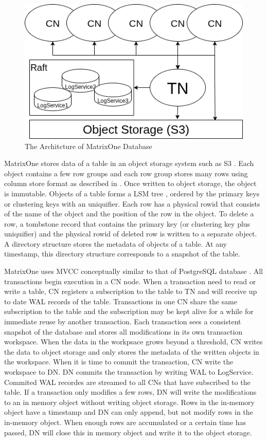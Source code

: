\documentclass[sigconf,nonacm]{acmart} %
\begin{document}
\begin{figure}[h]
  \centering
  \includegraphics[width=\linewidth]{m1a}
  \caption{The Architcture of MatrixOne Database}
\end{figure}

MatrixOne stores data of a table in an object storage system such as S3 \cite{S3}.  
Each object contains a few row groups and each row group stores many rows 
using column store format as described in \cite{ColumnStore}.  
Once written to object storage, the object is immutable.  
Objects of a table forms a LSM tree \cite{LSMTree}, 
ordered by the primary keys or clustering keys with an uniquifier.  
Each row has a physical rowid that consists of the name of the object 
and the position of the row in the object.
To delete a row, a tombstone record that contains the primary key 
(or clustering key plus uniquifier) and the physical rowid
of deleted row is written to a separate object.
A directory structure stores the metadata of objects of a table.  
At any timestamp, this directory structure corresponds 
to a snapshot of the table.

MatrixOne uses MVCC conceptually similar to that of 
PostgreSQL database \cite{PostgreSQL}.  
All transactions begin execution in a CN node.  When a transaction need to 
read or write a table, CN registers a subscription to the table to TN and
will receive up to date WAL records of the table.  Transactions in one CN
share the same subscription to the table and the subscription may be kept
alive for a while for immediate reuse by another transaction.
Each transaction sees a consistent snapshot of the database and stores 
all modifications in its own transaction workspace.  
When the data in the workpsace grows beyond a threshold, CN 
writes the data to object storage and only stores the metadata of the 
written objects in the workspace.  When it is time to 
commit the transaction, CN write the workspace to DN.  
DN commits the transaction by writing WAL to LogService.  
Commited WAL recordes are streamed to all CNs that have 
subscribed to the table.
If a transaction only modifies a few rows, DN will write the 
modifications to an in memory object without writing object storage.  
Rows in the in-memory object have a timestamp and DN can only 
append, but not modify rows in the in-memory object.  When enough 
rows are accumulated or a certain time has passed, DN will close 
this in memory object and write it to the object storage.  
\end{document}
